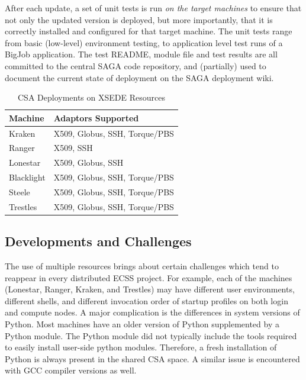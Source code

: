 \documentclass{sig-alternate}
\begin{document}
After each update, a set of unit tests is run \textit{on the
target machines} to ensure that not only the updated version is deployed, but
more importantly, that it is correctly installed and
configured for that target machine. The unit tests range from basic
(low-level) environment testing, to application level test runs of a
BigJob application. The test README, module file and test results
are all committed to the central SAGA code repository, and
(partially) used to document the current state of deployment on the
SAGA deployment wiki.

\begin{table}
\begin{center}
\begin{tabular}{ll}
\toprule
\textbf{Machine}  & 
\textbf{Adaptors Supported} 
\\ \midrule
Kraken   & 
X509, Globus, SSH, Torque/PBS
\\ \midrule
Ranger   & 
X509, SSH
\\ \midrule
Lonestar & 
X509, Globus, SSH
\\ \midrule
Blacklight & 
X509, Globus, SSH, Torque/PBS
\\ \midrule
Steele & 
X509, Globus, SSH, Torque/PBS
\\ \midrule
Trestles & 
X509, Globus, SSH, Torque/PBS
\\ \bottomrule
\end{tabular}
\caption{CSA Deployments on XSEDE Resources}
\label{table:CSA-Deployments}
\end{center}
\end{table}

\subsection{Developments and Challenges}

The use of multiple resources brings about certain challenges which
tend to reappear in every distributed ECSS project. For example, each
of the machines (Lonestar, Ranger, Kraken, and Trestles) may have
different user environments, different shells, and different
invocation order of startup profiles on both login and compute
nodes. A major complication is the differences in system versions of
Python. Most machines have an older version of Python supplemented by
a Python module. The Python module did not typically include the tools
required to easily install user-side python modules. Therefore, a
fresh installation of Python is always present in the shared CSA
space. A similar issue is encountered with GCC compiler versions as
well.
\end{document}
